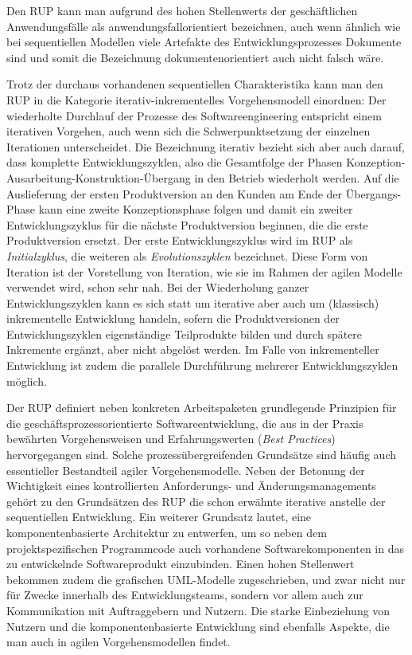 Den RUP kann man aufgrund des hohen Stellenwerts der geschäftlichen Anwendungsfälle als anwendungsfallorientiert bezeichnen, auch wenn ähnlich wie bei sequentiellen Modellen viele Artefakte des Entwicklungsprozesses Dokumente sind und somit die Bezeichnung dokumentenorientiert auch nicht falsch wäre.

\vspace{2mm} %


\vspace{1mm} %

Trotz der durchaus vorhandenen sequentiellen Charakteristika kann man den RUP in die Kategorie iterativ-inkrementelles Vorgehensmodell einordnen: Der wiederholte Durchlauf der Prozesse des Softwareengineering entspricht einem iterativen Vorgehen, auch wenn sich die Schwerpunktsetzung der einzelnen Iterationen unterscheidet. Die Bezeichnung iterativ bezieht sich aber auch darauf, dass komplette Entwicklungszyklen, also die Gesamtfolge der Phasen Konzeption-Ausarbeitung-Konstruktion-Übergang in den Betrieb wiederholt werden. Auf die Auslieferung der ersten Produktversion an den Kunden am Ende der Übergangs-Phase kann eine zweite Konzeptionsphase folgen und damit ein zweiter Entwicklungszyklus für die nächste Produktversion beginnen, die die erste Produktversion ersetzt. Der erste Entwicklungszyklus wird im RUP als \textit{Initialzyklus}, 
die weiteren als \textit{Evolutionszyklen} bezeichnet. Diese Form von Iteration ist der Vorstellung von Iteration, wie sie im Rahmen der agilen Modelle verwendet wird, schon sehr nah. Bei der Wiederholung ganzer Entwicklungszyklen kann es sich statt um iterative aber auch um (klassisch) inkrementelle Entwicklung handeln, sofern die Produktversionen der Entwicklungszyklen eigenständige Teilprodukte bilden und durch spätere Inkremente ergänzt, aber nicht abgelöst werden. Im Falle von inkrementeller Entwicklung ist zudem die parallele Durchführung mehrerer Entwicklungszyklen möglich.

Der RUP definiert neben konkreten Arbeitspaketen grundlegende Prinzipien für die geschäftsprozessorientierte Softwareentwicklung, die aus in der Praxis bewährten Vorgehensweisen und Erfahrungswerten (\textit{Best Practices}) 
hervorgegangen sind. Solche prozessübergreifenden Grundsätze sind häufig auch essentieller Bestandteil agiler Vorgehensmodelle. Neben der Betonung der Wichtigkeit eines kontrollierten Anforderungs- und Änderungsmanagements gehört zu den Grundsätzen des RUP die schon erwähnte iterative anstelle der sequentiellen Entwicklung. Ein weiterer Grundsatz lautet, eine komponentenbasierte Architektur zu entwerfen, um so neben dem projektspezifischen Programmcode auch vorhandene Softwarekomponenten in das zu entwickelnde Softwareprodukt einzubinden. Einen hohen Stellenwert bekommen zudem die grafischen UML-Modelle zugeschrieben, und zwar nicht nur für Zwecke innerhalb des Entwicklungsteams, sondern vor allem auch zur Kommunikation mit Auftraggebern und Nutzern. Die starke Einbeziehung von Nutzern und die komponentenbasierte Entwicklung sind ebenfalls Aspekte, die man auch in agilen Vorgehensmodellen findet.

